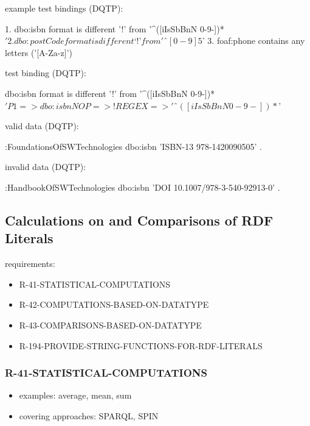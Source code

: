 \documentclass{llncs}
\begin{document}

example test bindings (DQTP):

\begin{ex}
1. dbo:isbn format is different ’!’ from '^([iIsSbBnN 0-9-])*$'
2. dbo:postCode format is different ‘!’ from 'ˆ[0-9]{5}$'
3. foaf:phone contains any letters ('[A-Za-z]')
\end{ex}

test binding (DQTP):

\begin{ex}
dbo:isbn format is different ’!’ from '^([iIsSbBnN 0-9-])*$'

P1 => dbo:isbn
NOP => !
REGEX => 'ˆ([iIsSbBnN 0-9-])*$'
\end{ex}

valid data (DQTP):

\begin{ex}
:FoundationsOfSWTechnologies
    dbo:isbn 'ISBN-13 978-1420090505' .
\end{ex}

invalid data (DQTP):

\begin{ex}
:HandbookOfSWTechnologies
    dbo:isbn 'DOI 10.1007/978-3-540-92913-0' .
\end{ex}

\subsection{Calculations on and Comparisons of RDF Literals}

requirements:

\begin{itemize}
	\item R-41-STATISTICAL-COMPUTATIONS
	\item R-42-COMPUTATIONS-BASED-ON-DATATYPE
	\item R-43-COMPARISONS-BASED-ON-DATATYPE
	\item R-194-PROVIDE-STRING-FUNCTIONS-FOR-RDF-LITERALS
\end{itemize}

\subsubsection{R-41-STATISTICAL-COMPUTATIONS}

\begin{itemize}
  \item examples: average, mean, sum
	\item covering approaches: SPARQL, SPIN
\end{itemize}
\end{document}
